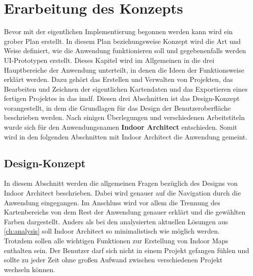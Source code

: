 \chapter{Erarbeitung des Konzepts}\label{ch:conception}
Bevor mit der eigentlichen Implementierung begonnen werden kann wird ein grober Plan erstellt.
In diesem Plan beziehungsweise Konzept wird die Art und Weise definiert, wie die Anwendung funktionieren soll und gegebenenfalls werden UI-Prototypen erstellt.\pbreak%
%
Dieses Kapitel wird im Allgemeinen in die drei Hauptbereiche der Anwendung unterteilt, in denen die Ideen der Funktionsweise erklärt werden.
Dazu gehört das Erstellen und Verwalten von Projekten, das Bearbeiten und Zeichnen der eigentlichen Kartendaten und das Exportieren eines fertigen Projektes in das \acl{imdf}.
Diesen drei Abschnitten ist das Design-Konzept vorangestellt, in dem die Grundlagen für das Design der Benutzeroberfläche beschrieben werden.\pbreak%
%
Nach einigen Überlegungen und verschiedenen Arbeitstiteln wurde sich für den Anwendungsnamen \textbf{Indoor Architect} entschieden.
Somit wird in den folgenden Abschnitten mit Indoor Architect die Anwendung gemeint.

\section{Design-Konzept}
In diesem Abschnitt werden die allgemeinen Fragen bezüglich des Designs von Indoor Architect beschrieben.
Dabei wird genauer auf die Navigation durch die Anwendung eingegangen.
Im Anschluss wird vor allem die Trennung des Kartenbereichs von dem Rest der Anwendung genauer erklärt und die gewählten Farben dargestellt.\pbreak%
%
Anders als bei den analysierten aktuellen Lösungen aus \autoref{ch:analysis} soll Indoor Architect so minimalistisch wie möglich werden.
Trotzdem sollen alle wichtigen Funktionen zur Erstellung von Indoor Maps enthalten sein.
Der Benutzer darf sich nicht in einem Projekt gefangen fühlen und sollte zu jeder Zeit ohne großen Aufwand zwischen verschiedenen Projekt wechseln können.

